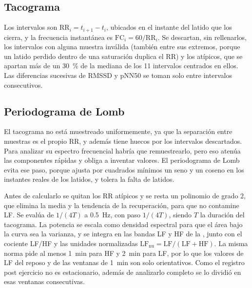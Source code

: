 \subsection{Tacograma}
\label{sec:met-tacograma}
Los intervalos son $\mathrm{RR}_i = t_{i+1} - t_i$, ubicados en el instante del latido que los cierra, y la frecuencia instantánea es $\mathrm{FC}_i = 60/\mathrm{RR}_i$. Se descartan, sin rellenarlos, los intervalos con alguna muestra inválida (también entre sus extremos, porque un latido perdido dentro de una saturación duplica el RR) y los atípicos, que se apartan más de un \SI{30}{\percent} de la mediana de los 11 intervalos centrados en ellos. Las diferencias sucesivas de RMSSD y pNN50 se toman solo entre intervalos consecutivos.

\subsection{Periodograma de Lomb}
\label{sec:met-lomb}
El tacograma no está muestreado uniformemente, ya que la separación entre muestras es el propio RR, y además tiene huecos por los intervalos descartados. Para analizar su espectro frecuencial habría que remuestrearlo, pero eso atenúa las componentes rápidas y obliga a inventar valores. El periodograma de Lomb evita ese paso, porque ajusta por cuadrados mínimos un seno y un coseno en los instantes reales de los latidos, y tolera la falta de latidos.

Antes de calcularlo se quitan los RR atípicos y se resta un polinomio de grado 2, que elimina la media y la tendencia de la recuperación, para que no contamine LF. Se evalúa de $1/(4T)$ a \SI{0.5}{\hertz}, con paso $1/(4T)$, siendo $T$ la duración del tacograma. La potencia se escala como densidad espectral para que el área bajo la curva sea la varianza, y se integra en las bandas LF y HF de la \textcite{taskforce1996}, junto con el cociente LF/HF y las unidades normalizadas $\mathrm{LF_{nu}} = \mathrm{LF}/(\mathrm{LF}+\mathrm{HF})$. La misma norma pide al menos \SI{1}{\minute} para HF y \SI{2}{\minute} para LF, por lo que los valores de LF del reposo y de las ventanas de \SI{1}{\minute} son solo orientativos. Como el registro post ejercicio no es estacionario, además de analizarlo completo se lo dividió en esas ventanas consecutivas.
